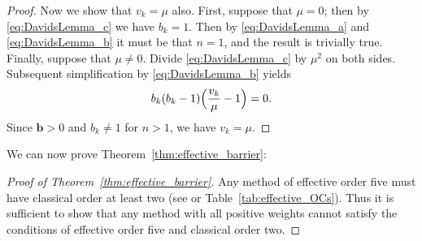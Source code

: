 \begin{proof}
	Now we show that $v_k = \mu$ also.  First, suppose that $\mu = 0$;
	then by \eqref{eq:DavidsLemma_c} we have $b_k = 1$.
        Then by \eqref{eq:DavidsLemma_a} and \eqref{eq:DavidsLemma_b} it must
        be that $n = 1$, and the result is trivially true.
	Finally, suppose that $\mu \neq 0$.  Divide \eqref{eq:DavidsLemma_c} by $\mu^2$ on both sides.
	Subsequent simplification by \eqref{eq:DavidsLemma_b} yields
	\begin{align*}
		b_k(b_k -1)\Bigl(\frac{v_k}{\mu} - 1\Bigr) = 0.
	\end{align*}
	Since $\bm{b} > 0$ and $b_k \neq 1$ for $n  > 1$, we have $v_k = \mu$.
	
\end{proof}

We can now prove Theorem~\ref{thm:effective_barrier}:
\begin{proof}[Proof of Theorem~\ref{thm:effective_barrier}]
	Any method of effective order five must have classical order at least two
	(see \cite{Butcher2008_book} or Table~\ref{tab:effective_OCs}).
    Thus it is sufficient to show that any method with all positive weights
    cannot satisfy the conditions of effective order five and classical order two.


\end{proof}
